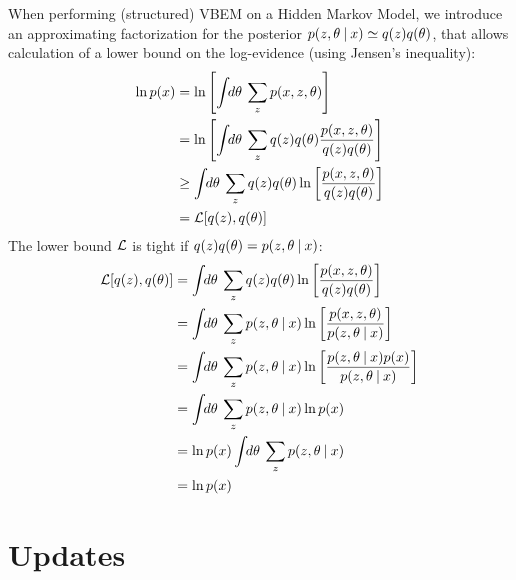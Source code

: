 When performing (structured) VBEM on a Hidden Markov Model, we introduce an approximating factorization for the posterior $p(z,\theta \:|\: x) \simeq q(z)q(\theta)$, that allows calculation of a lower bound on the log-evidence (using Jensen's inequality):
\begin{align}
  \begin{split}
  \ln p(x) &= \ln
              \left[
                \int \!\!d\theta \:
                \sum_{z} 
                p(x, z, \theta) 
              \right] \\
           &= \ln
              \left[
                \int \!\!d\theta \:
                \sum_{z}
                  q(z) q(\theta) 
                  \frac{p(x, z, \theta)}
                       {q(z) q(\theta)}
              \right] \\
           &\ge \int \!\!d\theta \:
                \sum_{z}  
                q(z) q(\theta)
                \ln
                \left[
                  \frac{p(x, z, \theta)}
                       {q(z) q(\theta)}  
                \right] \\
           &= \mathcal{L}[q(z), q(\theta)]
  \end{split}
\end{align} 
The lower bound $\mathcal{L}$ is tight if $q(z)q(\theta) = p(z, \theta \:|\: x)$:
\begin{align}
  \begin{split}
  \L[q(z), q(\theta)]
    &=
    \int \d{\theta}
    \sum_{z}  
    q(z) q(\theta)
    \ln
    \left[
      \frac{p(x, z, \theta)}
            {q(z) q(\theta)}  
    \right] \\  
    &=
    \int \d{\theta}
    \sum_{z}  
    \p{z, \theta}{x}
    \ln
    \left[
      \frac{p(x, z, \theta)}
            {\p{z, \theta}{x}}  
    \right] \\  
    &=
    \int \d{\theta}
    \sum_{z}  
    \p{z, \theta}{x}
    \ln
    \left[
      \frac{\p{z, \theta}{x} p(x)}
           {\p{z, \theta}{x}}  
    \right] \\  
    &=
    \int \d{\theta}
    \sum_{z}  
    \p{z, \theta}{x}
    \ln p(x) \\  
    &=
    \ln p(x)
    \int \d{\theta}
    \sum_{z}  
    \p{z, \theta}{x} \\
    &=
     \ln p(x)
  \end{split}
\end{align}

\section{Updates}

